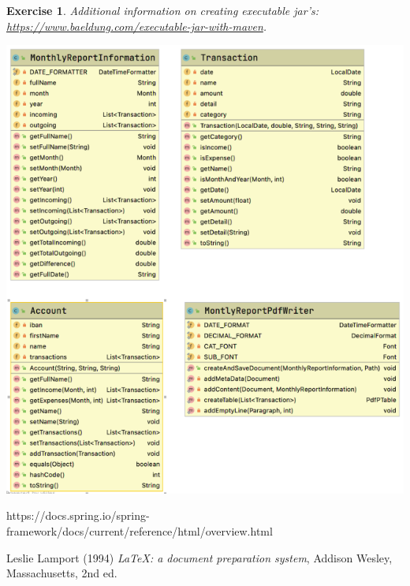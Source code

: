 \documentclass[a4paper, 12pt]{report}
\newenvironment{boxexercise}
{\begin{tcolorbox}
[enhanced jigsaw,breakable,pad at break*=1mm,
 colback=tsyellow!20,boxrule=0pt,frame hidden]}
{\end{tcolorbox}}
\newtheorem{envoefening}{\textbf{Exercise}}[chapter]
\newenvironment{oefening}
               {\begin{boxexercise}\begin{envoefening}}
               {\end{envoefening}\end{boxexercise}}
\begin{document}
\begin{oefening}
Additional information on creating executable jar's: \url{https://www.baeldung.com/executable-jar-with-maven}.

\includegraphics[width=\textwidth]{./images/chapter3/exercise-class-diagram} 

\end{oefening}

\begin{thebibliography}{9}
https://docs.spring.io/spring-framework/docs/current/reference/html/overview.html

Leslie Lamport (1994) \emph{\LaTeX: a document preparation system}, Addison
Wesley, Massachusetts, 2nd ed.


\end{thebibliography}
\end{document}
